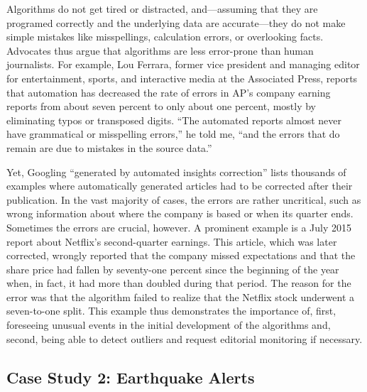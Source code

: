 \documentclass[notoc, symmetric, nobib, nols]{towcenter-guideto-book}
\begin{document}
Algorithms do not get tired or distracted, and---assuming that they are programed correctly and the underlying data are accurate---they do not make simple mistakes like misspellings, calculation errors, or overlooking facts. Advocates thus argue that algorithms are less error-prone than human journalists. For example, Lou Ferrara, former vice president and managing editor for entertainment, sports, and interactive media at the Associated Press, reports that automation has decreased the rate of errors in AP's company earning reports from about seven percent to only about one percent, mostly by eliminating typos or transposed digits. ``The automated reports almost never have grammatical or misspelling errors,'' he told me, ``and the errors that do remain are due to mistakes in the source data.''

Yet, Googling ``generated by automated insights correction'' lists thousands of examples where automatically generated articles had to be corrected after their publication.\autocite{diak15} In the vast majority of cases, the errors are rather uncritical, such as wrong information about where the company is based or when its quarter ends. Sometimes the errors are crucial, however. A prominent example is a July 2015 report about Netflix's second-quarter earnings.\autocite{ap15-2} This article, which was later corrected, wrongly reported that the company missed expectations and that the share price had fallen by seventy-one percent since the beginning of the year when, in fact, it had more than doubled during that period. The reason for the error was that the algorithm failed to realize that the Netflix stock underwent a seven-to-one split. This example thus demonstrates the importance of, first, foreseeing unusual events in the initial development of the algorithms and, second, being able to detect outliers and request editorial monitoring if necessary.\autocite{leco15}

\subsection{Case Study 2: Earthquake Alerts}
\end{document}

